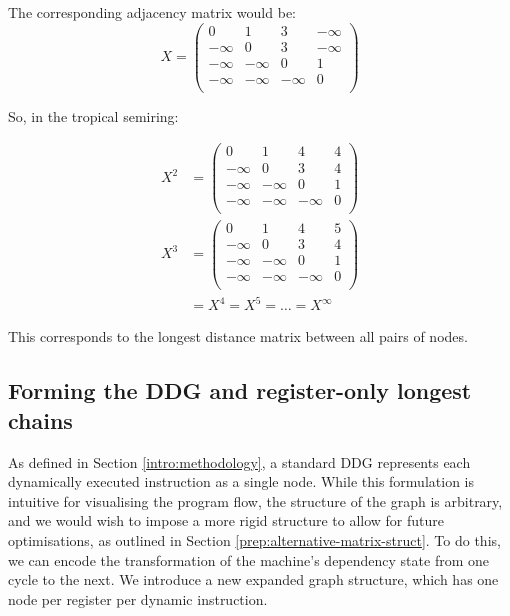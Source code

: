 The corresponding adjacency matrix would be:
$$
X = 
\begin{pmatrix}
  0 & 1 & 3 & -\infty \\ 
  -\infty & 0 & 3 & -\infty \\ 
  -\infty & -\infty & 0 & 1 \\
  -\infty & -\infty & -\infty & 0 \\
\end{pmatrix}
$$

So, in the tropical semiring:

$$
\begin{aligned}
  X^{2} &= 
  \begin{pmatrix}
    0 & 1 & 4 & 4 \\ 
    -\infty & 0 & 3 & 4 \\ 
    -\infty & -\infty & 0 & 1 \\ 
    -\infty & -\infty & -\infty & 0 \\
  \end{pmatrix} \\ 
  X^{3} &= 
  \begin{pmatrix}
    0 & 1 & 4 & 5 \\ 
    -\infty & 0 & 3 & 4 \\ 
    -\infty & -\infty & 0 & 1 \\ 
    -\infty & -\infty & -\infty & 0 \\
  \end{pmatrix} \\ 
        & = X^{4} = X^{5} = \dots = X^{\infty}
\end{aligned}
$$

This corresponds to the longest distance matrix between all pairs of nodes.

\subsection{Forming the DDG and register-only longest chains} \label{prep:register-only-chains}

As defined in Section \ref{intro:methodology}, a standard DDG represents 
each dynamically executed instruction as a single node. While this formulation is intuitive for visualising the program 
flow, the structure of the graph is arbitrary, and we would wish to impose a more rigid structure to allow for future
optimisations, as outlined in Section \ref{prep:alternative-matrix-struct}.
To do this, we can encode the transformation of the machine's dependency state from one cycle to the next.
We introduce a new expanded graph structure, which has one node per register per dynamic instruction.

